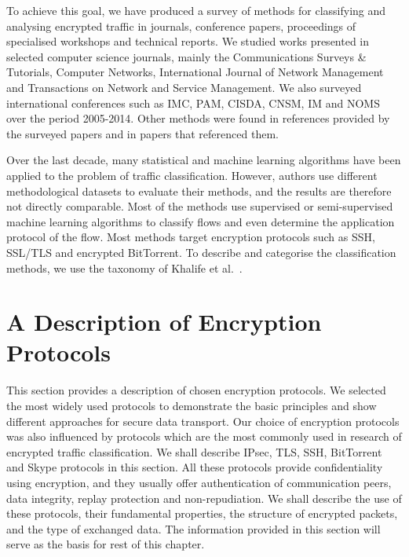 To achieve this goal, we have produced a survey of methods for classifying and analysing encrypted traffic in journals, conference papers, proceedings of specialised workshops and technical reports. We studied works presented in selected computer science journals, mainly the Communications Surveys \& Tutorials, Computer Networks, International Journal of Network Management and Transactions on Network and Service Management. We also surveyed international conferences such as IMC, PAM, CISDA, CNSM, IM and NOMS over the period 2005-2014. Other methods were found in references provided by the surveyed papers and in papers that referenced them.

Over the last decade, many statistical and machine learning algorithms have been applied to the problem of traffic classification. However, authors use different methodological datasets to evaluate their methods, and the results are therefore not directly comparable. Most of the methods use supervised or semi-supervised machine learning algorithms to classify flows and even determine the application protocol of the flow. Most methods target encryption protocols such as SSH, SSL/TLS and encrypted BitTorrent. To describe and categorise the classification methods, we use the taxonomy of Khalife et al.~\cite{Khalife-2014-multilevel}. 




\section{A Description of Encryption Protocols} \label{sec:traffic-description}

This section provides a description of chosen encryption protocols. We selected the most widely used protocols to demonstrate the basic principles and show different approaches for secure data transport. Our choice of encryption protocols was also influenced by protocols which are the most commonly used in research of encrypted traffic classification. We shall describe IPsec, TLS, SSH, BitTorrent and Skype protocols in this section. All these protocols provide confidentiality using encryption, and they usually offer authentication of communication peers, data integrity, replay protection and non-repudiation. We shall describe the use of these protocols, their fundamental properties, the structure of encrypted packets, and the type of exchanged data. The information provided in this section will serve as the basis for rest of this chapter.

